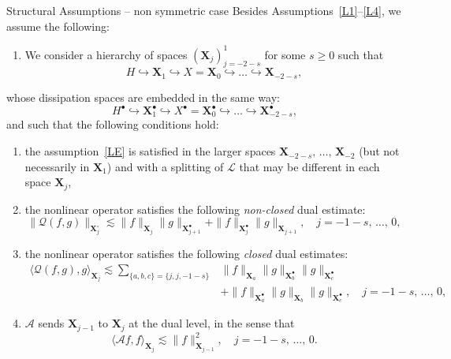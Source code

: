 \documentclass[10pt]{amsart}
\theoremstyle{definition}\newtheorem{defi}[theo]{Definition}\newtheorem{rema}[theo]{Remark}\newtheorem{exam}[theo]{Example}\newtheorem{exem}[theo]{Example}\newtheorem{nota}[theo]{Notation}
\renewcommand{\AA}{\mathcal{A}}
\newcommand{\LL}{\mathcal{L}}
\newcommand{\QQ}{\mathcal{Q}}
\newcommand{\Ss}{H}
\newcommand{\Ssp}{H^{\bullet}}
\newcommand{\Sl}{X}
\newcommand{\Slp}{X^{\bullet}}
\newcommand{\Sh}{\bm{X}}
\newcommand{\Shp}{\bm{X}^{\bullet}}
\newcommand{\Shm}{\bm{X}^{\circ}}
\renewcommand*\ge{\geqslant}
\newcommand{\hypst}[1]{\textnormal{\textbf{#1}}}
\newcommand{\la}{\langle}
\newcommand{\ra}{\rangle}
\newcommand*{\relabel}{\renewcommand{\labelenumi}{(\theenumi)}}
\newcommand*{\alphenumi}{\renewcommand*{\theenumi}{\alph{enumi}}\relabel}
\begin{document}
\begin{enonce*}
{Structural Assumptions -- non symmetric case}
Besides Assumptions~\eqref{L1}--\eqref{L4}, we assume the following:
\begin{enumerate}[label=\hypst{BED}]
\item \label{BED}
We consider a hierarchy of spaces $(\Sh_j)_{j=-2-s}^1$ for some $s \ge 0$ such that
\[
\Ss \hookrightarrow \Sh_1 \hookrightarrow \Sl = \Sh_{0} \hookrightarrow \dots \hookrightarrow \Sh_{-2-s},
\]
\end{enumerate}
whose dissipation spaces are embedded in the same way:
\[
\Ssp \hookrightarrow \Shp_1 \hookrightarrow \Slp = \Shp_{0} \hookrightarrow \dots \hookrightarrow \Shp_{-2-s},
\]
and such that the following conditions hold:
\begin{enumerate}\alphenumi
\item the assumption~\eqref{LE} is satisfied in the larger spaces $\Sh_{-2-s},\,\dots,\,\Sh_{-2}$ (but not necessarily in $\Sh_1$) and with a splitting of $\LL$ that may be different in each space $\Sh_j$,
\item the nonlinear operator satisfies the following \emph{non-closed} dual estimate:
\begin{equation}\label{eq:BEDNon}
\| \QQ(f, g) \|_{\Shm_{j} }
\lesssim
\| f \|_{\Sh_{j}} \| g \|_{\Shp_{j+1}} + \| f \|_{\Shp_{j}} \| g \|_{\Sh_{j+1}}, \quad j=-1-s,\,\dots,\,0,
\end{equation}
\item the nonlinear operator satisfies the following \emph{closed} dual estimates:
\begin{equation}\label{eq:BEDclosed}
\begin{split}
\la \QQ(f, g), g \ra_{ \Sh_{j} }
\lesssim \sum_{ \{ a, b, c \} = \{j, j, -1-s \} } & \| f \|_{\Sh_{ a }} \| g \|_{\Shp_{b}} \| g \|_{\Shp_{c}} \\
& + \| f \|_{\Shp_{a}} \| g \|_{\Sh_{b}} \| g \|_{\Shp_{c}}, \quad j = -1-s,\,\dots,\,0,
\end{split}
\end{equation}
\item $\AA$ sends $\Sh_{j-1}$ to $\Sh_{j}$ at the dual level, in the sense that
\[
\la \AA f, f \ra_{\Sh_{j}} \lesssim \| f \|^2_{ \Sh_{j-1} }, \quad j=-1-s,\,\dots,\,0.
\]
\end{enumerate}
\end{enonce*}
\end{document}
